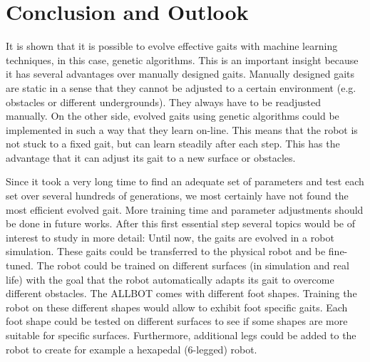 \graphicspath{{figures/}}



\chapter{Conclusion and Outlook}\label{chap:conclusion_outlook}

It is shown that it is possible to evolve effective gaits with machine learning techniques, in this case, genetic algorithms.
This is an important insight because it has several advantages over manually designed gaits.
Manually designed gaits are static in a sense that they cannot be adjusted to a certain environment (e.g. obstacles or different undergrounds).
They always have to be readjusted manually.
On the other side, evolved gaits using genetic algorithms could be implemented in such a way that they learn on-line.
This means that the robot is not stuck to a fixed gait, but can learn steadily after each step.
This has the advantage that it can adjust its gait to a new surface or obstacles.

Since it took a very long time to find an adequate set of parameters and test each set over several hundreds of generations, we most certainly have not found the most efficient evolved gait.
More training time and parameter adjustments should be done in future works.
After this first essential step several topics would be of interest to study in more detail: 
Until now, the gaits are evolved in a robot simulation. 
These gaits could be transferred to the physical robot and be fine-tuned.
The robot could be trained on different surfaces (in simulation and real life) with the goal that the robot automatically adapts its gait to overcome different obstacles.
The ALLBOT comes with different foot shapes.
Training the robot on these different shapes would allow to exhibit foot specific gaits.
Each foot shape could be tested on different surfaces to see if some shapes are more suitable for specific surfaces.
Furthermore, additional legs could be added to the robot to create for example a hexapedal (6-legged) robot.


